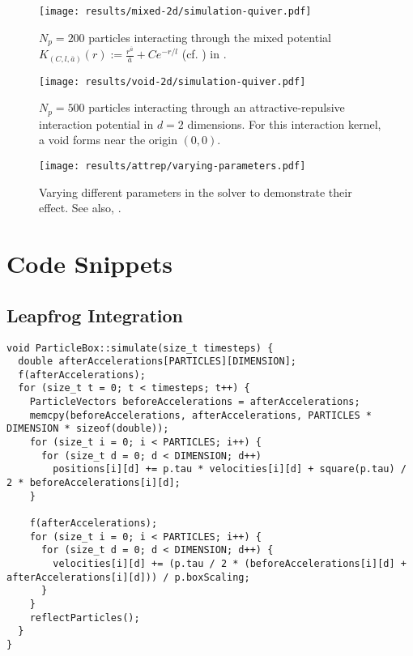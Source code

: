 \begin{figure}[H]
  \centering
  \texttt{[image: results/mixed-2d/simulation-quiver.pdf]}
  \caption[2D quiver plot for the mixed potential]{$N_p = 200$ particles interacting through the mixed potential $K_{(C, l, \bar{a})}(r) := \frac{r^{\bar{a}}}{\bar{a}} + C e^{-r/l}$ (cf. ) in .}
  \label{fig:mixed-2d-quiver}
\end{figure}

\begin{figure}[H]
  \centering
  \texttt{[image: results/void-2d/simulation-quiver.pdf]}
  \caption[2D quiver plot with a void]{$N_p = 500$ particles interacting through an attractive-repulsive interaction potential in $d=2$ dimensions. For this interaction kernel, a void forms near the origin $(0, 0)$.}
  \label{fig:void-2d-quiver}
\end{figure}

\pagebreak
\begin{figure}[H]
  \centering
  \texttt{[image: results/attrep/varying-parameters.pdf]}
  \caption[Varying parameters in the solver]{
    Varying different parameters in the solver to demonstrate their effect.
    See also, .
  }
  \label{fig:varying-parameters}
\end{figure}
\pagebreak

\chapter{Code Snippets}
\label{appendix:code-snippets}

\section{Leapfrog Integration}
\begin{verbatim}
void ParticleBox::simulate(size_t timesteps) {
  double afterAccelerations[PARTICLES][DIMENSION];
  f(afterAccelerations);
  for (size_t t = 0; t < timesteps; t++) {
    ParticleVectors beforeAccelerations = afterAccelerations;
    memcpy(beforeAccelerations, afterAccelerations, PARTICLES * DIMENSION * sizeof(double));
    for (size_t i = 0; i < PARTICLES; i++) {
      for (size_t d = 0; d < DIMENSION; d++)
        positions[i][d] += p.tau * velocities[i][d] + square(p.tau) / 2 * beforeAccelerations[i][d];
    }

    f(afterAccelerations);
    for (size_t i = 0; i < PARTICLES; i++) {
      for (size_t d = 0; d < DIMENSION; d++) {
        velocities[i][d] += (p.tau / 2 * (beforeAccelerations[i][d] + afterAccelerations[i][d])) / p.boxScaling;
      }
    }
    reflectParticles();
  }
}
\end{verbatim}

